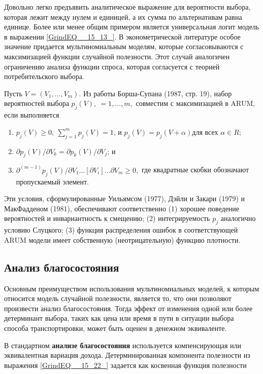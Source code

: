 Довольно легко предъявить аналитическое выражение для вероятности выбора, которая лежит между нулем и единицей, а их сумма по альтернативам равна единице. Более или менее общим примером является универсальная логит модель в выражении \eqref{GrindEQ__15_13_}. В эконометрической литературе особое значение придается  мультиномиальным моделям, которые согласовываются с максимизацией функции случайной полезности. Этот случай аналогичен ограничению анализа функции спроса, которая согласуется с теорией потребительского выбора. 

Пусть $V=\left(V_1,\dots ,V_m\right).$ Из работы Борша-Супана (1987, стр. 19), набор вероятностей выбора $p_j\left(V\right),\ =1,\dots ,m,$ совместим с максимизацией в ARUM, если выполняется

\begin{enumerate}
\item  $p_j\left(V\right)\ge 0,\ \sum^m_{j=1}{p_j\left(V\right)=1}$, и $p_j(V)=p_j(V+\alpha )$для всех $\alpha \in R$;

\item  ${\partial p_j(V)}/{\partial V_k}={\partial p_k(V)}/{\partial V_j}$; и

\item  ${{\partial }^{\left(m-1\right)}p_j(V)}/{\partial V_1\dots \left[\partial V_i\right]\dots \partial V_m\ge 0,}$ где квадратные скобки обозначают пропускаемый элемент.
\end{enumerate}

Эти условия, сформулированные Уильямсом (1977), Дэйли и Закари (1979) и МакФадденом (1981), обеспечивают соответственно (1) хорошее поведение вероятностей и инвариантность к смещению; (2) интегрируемость $p_j$ аналогично условию Слуцкого; (3) функция распределения ошибок в соответствующей ARUM модели имеет собственную (неотрицательную) функцию плотности.

\subsection{Анализ благосостояния}

Основным преимуществом использования мультиномиальных моделей, к которым относится модель случайной полезности, является то, что они позволяют произвести анализ благосостояния. Тогда эффект от изменения одной или более детерминант выбора, таких как цена или время в пути в ситуации выбора способа транспортировки, может быть оценен в денежном эквиваленте.

В стандартном \textbf{анализе благосостояния} используется компенсирующая или эквивалентная вариация дохода. Детерминированная компонента полезности из выражения \eqref{GrindEQ__15_22_} задается как косвенная функция полезности

